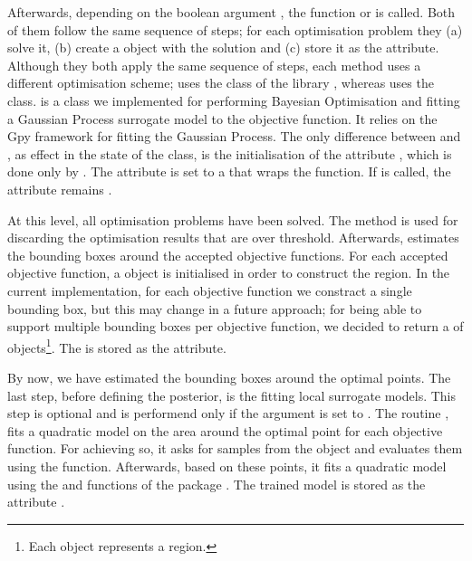 Afterwards, depending on the boolean argument
, the function \linebreak {}
or  is called. Both of them follow the same
sequence of steps; for each optimisation problem they (a) solve it,
(b) create a  object with the solution
and (c) store it as the 
attribute. Although they both apply the same sequence of steps, each
method uses a different optimisation scheme;
 uses the  class of the
 library \autocite{2020SciPy-NMeth}, whereas
 uses the  class.
 is a class we implemented for performing
Bayesian Optimisation and fitting a Gaussian Process surrogate model
to the objective function. It relies on the Gpy framework
\autocite{gpy2014} for fitting the Gaussian Process. The only
difference between  and ,
as effect in the state of the  class, is
the initialisation of the attribute 
, which is done only by
. The attribute is set to a  that
wraps the  function. If
 is called, the attribute remains
.

At this level, all optimisation problems have been solved. The method
 is used for discarding the optimisation
results that are over threshold. Afterwards, 
estimates the bounding boxes around the accepted objective
functions. For each accepted objective function, a
 object is initialised in order to
construct the region. In the current implementation, for each
objective function we constract a single bounding box, but this may
change in a future approach; for being able to support multiple
bounding boxes per objective function, we decided to return a
 of  objects\footnote{Each
   object represents a region.}. The
 is stored as the 
attribute.

By now, we have estimated the bounding boxes around the optimal
points. The last step, before defining the posterior, is the fitting
local surrogate models. This step is optional and is performend only
if the argument  is set to . The
routine , fits a quadratic model on the area
around the optimal point for each objective function. For achieving
so, it asks for samples from the  object and
evaluates them using the 
function. Afterwards, based on these points, it fits a quadratic model
using the  and
 functions of the
 package \autocite{scikit-learn}. The trained
model is stored as the attribute
.


